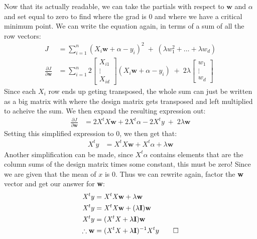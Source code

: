 \documentclass[11pt]{article}
\theoremstyle{quest}
\begin{document}
Now that its actually readable, we can take the partials with respect to $\mathbf{w}$ and $\alpha$ and set equal to zero to find where the grad is 0 and where we have a critical minimum point. 
We can write the equation again, in terms of a sum of all the row vectors:
\begin{equation}
  \begin{split}
    \nonumber
    J &= \sum_{i=1}^{n} (X_{i}\mathbf{w} + \alpha - y_i)^2 \;+\; (\lambda w_1^2 + \hdots + \lambda w_d)\\
    \frac{\partial J}{\partial \mathbf{w}} &= \sum_{i=1}^{n} 2 \left[\begin{matrix}X_{i1}\\\vdots\\X_{id}\end{matrix}\right](X_{i}\mathbf{w} + \alpha - y_i) \;+\; 2\lambda\left[\begin{matrix}w_1\\\vdots\\w_d\end{matrix}\right]
  \end{split}
\end{equation}
Since each $X_i$ row ends up geting transposed, the whole sum can just be written as a big matrix with where the design matrix gets transposed and left multiplied to acheive the sum. We then expand the resulting expression out:
\begin{equation}
  \begin{split}
    \nonumber
    \frac{\partial J}{\partial \mathbf{w}} &= 2\mathit{X}^t\mathit{X}\mathbf{w} + 2\mathit{X}^t\alpha - 2\mathit{X}^ty \;+\; 2\lambda \mathbf{w}
  \end{split}
\end{equation}
Setting this simplified expression to 0, we then get that:
\begin{equation}
  \begin{split}
    \nonumber
    \mathit{X}^ty &= \mathit{X}^t\mathit{X}\mathbf{w} + \mathit{X}^t\alpha + \lambda \mathbf{w}
  \end{split}
\end{equation}
Another simplification can be made, since $X^t\alpha$ contains elements that are the column sums of the design matrix times some constant, this must be zero! Since we are given that the mean of $x$ is 0. Thus we can rewrite again, factor the \textbf{w} vector and get our answer for \textbf{w}:
\begin{equation}
  \begin{split}
    \nonumber
    \mathit{X}^ty &= \mathit{X}^t\mathit{X}\mathbf{w} + \lambda \mathbf{w}\\
    \mathit{X}^ty &= \mathit{X}^t\mathit{X}\mathbf{w} + (\lambda \mathbf{I})\mathbf{w}\\
    \mathit{X}^ty &= (\mathit{X}^t\mathit{X} + \lambda \mathbf{I})\mathbf{w}\\
    \therefore \mathbf{w} &= (\mathit{X}^t\mathit{X} + \lambda \mathbf{I})^{-1}\mathit{X}^ty \qed
  \end{split}
\end{equation}
\end{document}
